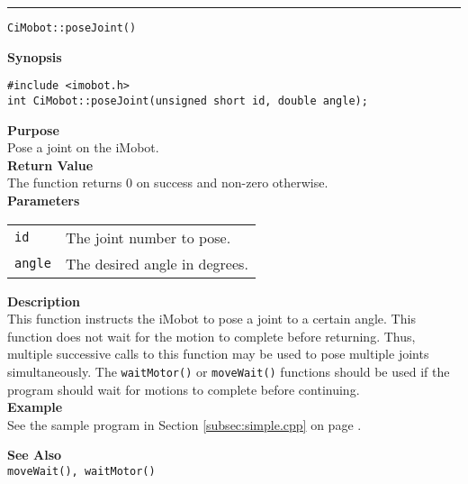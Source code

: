 \noindent
\vspace{5pt}
\rule{6.5in}{0.015in}
\noindent
{\LARGE \texttt{CiMobot::poseJoint()}}\\
{}

\noindent
{\bf Synopsis}\\
\begin{verbatim}
#include <imobot.h>
int CiMobot::poseJoint(unsigned short id, double angle);
\end{verbatim}

\noindent
{\bf Purpose}\\
Pose a joint on the iMobot.\\

\noindent
{\bf Return Value}\\
The function returns 0 on success and non-zero otherwise.\\

\noindent
{\bf Parameters}
\vspace{-0.1in}
\begin{description}
\item               
\begin{tabular}{p{10 mm}p{145 mm}}
\texttt{id} & The joint number to pose. \\
\texttt{angle} & The desired angle in degrees.
\end{tabular}
\end{description}

\noindent
{\bf Description}\\
This function instructs the iMobot to pose a joint to a certain angle. This
function does not wait for the motion to complete before returning. Thus,
multiple successive calls to this function may be used to pose multiple joints
simultaneously. The \texttt{waitMotor()} or \texttt{moveWait()} functions should
be used if the program should wait for motions to complete before continuing. \\

\noindent
{\bf Example}\\
See the sample program in Section \ref{subsec:simple.cpp} on page \pageref{subsec:simple.cpp}.
\noindent

\noindent
{\bf See Also}\\
\texttt{moveWait(), waitMotor()}


